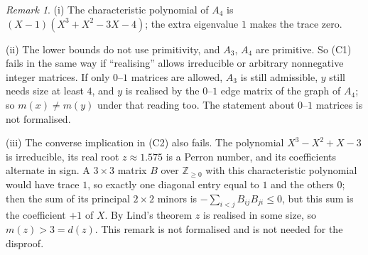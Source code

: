 \documentclass[11pt]{article}
\theoremstyle{remark}
\newtheorem*{remark}{Remark}
\begin{document}
\begin{remark}
(i) The characteristic polynomial of $A_4$ is
$(X-1)(X^3+X^2-3X-4)$; the extra eigenvalue $1$ makes the trace zero.

(ii) The lower bounds do not use primitivity, and $A_3$, $A_4$ are
primitive. So (C1) fails in the same way if ``realising'' allows
irreducible or arbitrary nonnegative integer matrices. If only
$0$--$1$ matrices are allowed, $A_3$ is still admissible, $y$ still
needs size at least $4$, and $y$ is realised by the $0$--$1$ edge
matrix of the graph of $A_4$; so $m(x)\ne m(y)$ under that reading
too. The statement about $0$--$1$ matrices is not formalised.

(iii) The converse implication in (C2) also fails. The polynomial
$X^3-X^2+X-3$ is irreducible, its real root $z\approx1.575$ is a Perron
number, and its coefficients alternate in sign. A $3\times3$ matrix $B$
over $\mathbb{Z}_{\ge0}$ with this characteristic polynomial would have
trace $1$, so exactly one diagonal entry equal to $1$ and the others
$0$; then the sum of its principal $2\times2$ minors is
$-\sum_{i<j}B_{ij}B_{ji}\le0$, but this sum is the coefficient $+1$ of
$X$. By Lind's theorem $z$ is realised in some size, so
$m(z)>3=d(z)$. This remark is not formalised and is not needed for the
disproof.
\end{remark}
\end{document}
